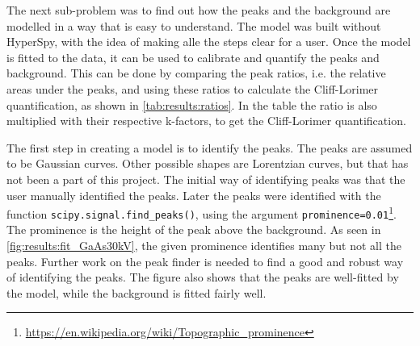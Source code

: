 The next sub-problem was to find out how the peaks and the background are modelled in a way that is easy to understand.
The model was built without HyperSpy, with the idea of making alle the steps clear for a user.
Once the model is fitted to the data, it can be used to calibrate and quantify the peaks and background.
This can be done by comparing the peak ratios, i.e. the relative areas under the peaks, and using these ratios to calculate the Cliff-Lorimer quantification, as shown in \cref{tab:results:ratios}.
In the table the ratio is also multiplied with their respective k-factors, to get the Cliff-Lorimer quantification.

The first step in creating a model is to identify the peaks.
The peaks are assumed to be Gaussian curves.
Other possible shapes are Lorentzian curves, but that has not been a part of this project.
The initial way of identifying peaks was that the user manually identified the peaks.
Later the peaks were identified with the function \verb|scipy.signal.find_peaks()|, using the argument \verb|prominence=0.01|\footnote{\url{https://en.wikipedia.org/wiki/Topographic_prominence}}.
The prominence is the height of the peak above the background.
As seen in \cref{fig:results:fit_GaAs30kV}, the given prominence identifies many but not all the peaks.
Further work on the peak finder is needed to find a good and robust way of identifying the peaks.
The figure also shows that the peaks are well-fitted by the model, while the background is fitted fairly well.




